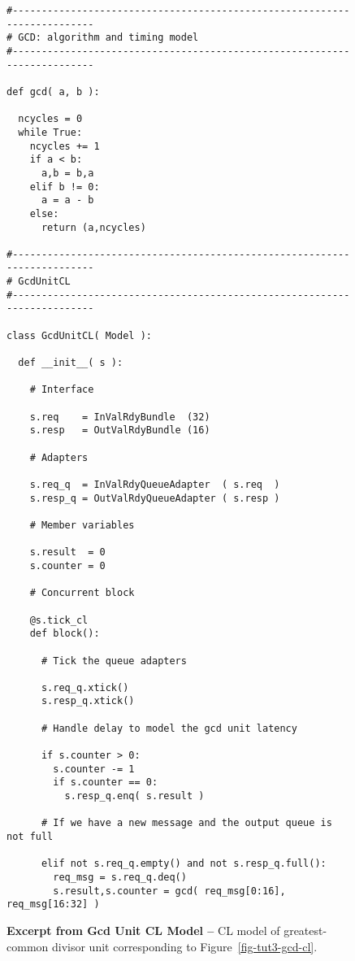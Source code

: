 
\begin{figure}

  \begin{lstlisting}[xleftmargin={0.9in}]
#-------------------------------------------------------------------------
# GCD: algorithm and timing model
#-------------------------------------------------------------------------

def gcd( a, b ):

  ncycles = 0
  while True:
    ncycles += 1
    if a < b:
      a,b = b,a
    elif b != 0:
      a = a - b
    else:
      return (a,ncycles)

#-------------------------------------------------------------------------
# GcdUnitCL
#-------------------------------------------------------------------------

class GcdUnitCL( Model ):

  def __init__( s ):

    # Interface

    s.req    = InValRdyBundle  (32)
    s.resp   = OutValRdyBundle (16)

    # Adapters

    s.req_q  = InValRdyQueueAdapter  ( s.req  )
    s.resp_q = OutValRdyQueueAdapter ( s.resp )

    # Member variables

    s.result  = 0
    s.counter = 0

    # Concurrent block

    @s.tick_cl
    def block():

      # Tick the queue adapters

      s.req_q.xtick()
      s.resp_q.xtick()

      # Handle delay to model the gcd unit latency

      if s.counter > 0:
        s.counter -= 1
        if s.counter == 0:
          s.resp_q.enq( s.result )

      # If we have a new message and the output queue is not full

      elif not s.req_q.empty() and not s.resp_q.full():
        req_msg = s.req_q.deq()
        s.result,s.counter = gcd( req_msg[0:16], req_msg[16:32] )
\end{lstlisting}

  \caption{\textbf{Excerpt from Gcd Unit CL Model --} CL model of greatest-common
    divisor unit corresponding to Figure~\ref{fig-tut3-gcd-cl}.}
  \label{code-tut3-gcd-cl}

\end{figure}

